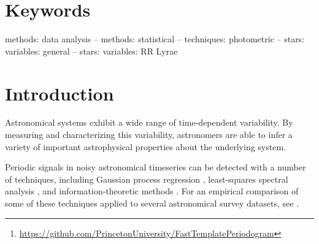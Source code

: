 \documentclass[apj]{emulateapj}
\begin{document}
\begin{abstract}
    We extend the method to heterogeneous signal classes with a small template vocabulary, and calibrate its significance against a measured pure-noise null. On simulated sparse multi-band surveys the template shape prior substantially improves period recovery over Lomb-Scargle in the few-epochs-per-band regime, and a bounded demonstration on Zwicky Transient Facility RR~Lyrae recovers periods on par with the strongest baseline methods while exposing the practical limits set by truth-catalog precision and by the excess variance of real photometry relative to Gaussian noise models.
    An open-source implementation of the fast template periodogram is freely available online.\footnote{\url{https://github.com/PrincetonUniversity/FastTemplatePeriodogram}}
\end{abstract}

\section*{Keywords}
\noindent methods: data analysis -- methods: statistical -- techniques: photometric -- stars: variables: general -- stars: variables: RR Lyrae

\section{Introduction}\label{sec:introduction}

Astronomical systems exhibit a wide range of time-dependent variability. By measuring and
characterizing this variability, astronomers are able to infer a variety of important
astrophysical properties about the underlying system.

Periodic signals in noisy astronomical timeseries can be detected with a number of techniques,
including Gaussian process regression \citep{Foreman-Mackey_etal_2017,Rasmussen+Williams_2006,Aigrain+Foreman-Mackey_2023,Gordon_etal_2021},
least-squares spectral analysis \citep{Lomb_1976,Scargle_1982,Barning_1963,Vanicek_1971}, and
information-theoretic methods \citep{Graham_etal_2013b,Huijse_etal_2012,Cincotta_etal_1995}. For an empirical
comparison of some of these techniques applied to several astronomical survey datasets, see
\cite{Graham_etal_2013}.
\end{document}
